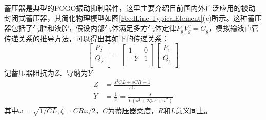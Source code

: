\begin{enumerate}[label=\textbf{\Roman*.}, align=left, leftmargin=0pt, listparindent=\parindent, itemindent=!, labelwidth=\parindent, labelsep=0pt, itemsep=1em]
蓄压器是典型的POGO振动抑制器件，这里主要介绍目前国内外广泛应用的被动封闭式蓄压器，其简化物理模型如图\ref{FeedLine-TypicalElement}(c)所示。这种蓄压器包括了气腔和液腔，假设内部气体满足多方气体定律$P_gV_g^{\gamma}=C_g$，模拟输液直管传递关系的推导方法，可以得出其如下的传递关系：
\begin{equation}
\left[ \begin{matrix}
   {P_2}  \\
   {Q_2}  \\
\end{matrix} \right]=\left[ \begin{matrix}
   1 & 0  \\
   -Y & 1  \\
\end{matrix} \right]\left[ \begin{matrix}
   {P_1}  \\
   {Q_1}  \\
\end{matrix} \right]
\end{equation}
记蓄压器阻抗为$Z$、导纳为$Y$
\begin{align}
	Z&=\frac{s^2CL+sCR+1}{sC} \nonumber\\
	Y&=\frac{1}{Z}=\frac{s}{\displaystyle L\left(s^2+2\zeta\omega s+\omega^2 \right)} \nonumber
\end{align}
其中$\omega=\sqrt{1/CL},\zeta=CR\omega/2$，$C$为蓄压器柔度，$R$和$L$意义同上。
\end{enumerate}

